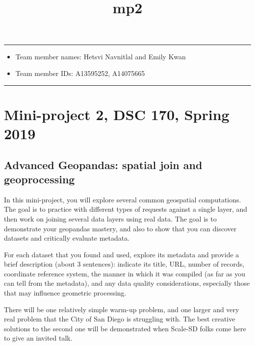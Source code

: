 \documentclass[11pt]{article}
\title{mp2}
\providecommand{\tightlist}{%
      \setlength{\itemsep}{0pt}\setlength{\parskip}{0pt}}
\begin{document}
    
    
    \maketitle
    
    

    
    \begin{center}\rule{0.5\linewidth}{\linethickness}\end{center}

\begin{itemize}
\tightlist
\item
  Team member names: Hetsvi Navnitlal and Emily Kwan
\item
  Team member IDs: A13595252, A14075665
\end{itemize}

\begin{center}\rule{0.5\linewidth}{\linethickness}\end{center}

    \hypertarget{mini-project-2-dsc-170-spring-2019}{%
\section{Mini-project 2, DSC 170, Spring
2019}\label{mini-project-2-dsc-170-spring-2019}}

\hypertarget{advanced-geopandas-spatial-join-and-geoprocessing}{%
\subsection{Advanced Geopandas: spatial join and
geoprocessing}\label{advanced-geopandas-spatial-join-and-geoprocessing}}

    In this mini-project, you will explore several common geospatial
computations. The goal is to practice with different types of requests
against a single layer, and then work on joining several data layers
using real data. The goal is to demonstrate your geopandas mastery, and
also to show that you can discover datasets and critically evaluate
metadata.

For each dataset that you found and used, explore its metadata and
provide a brief description (about 3 sentences): indicate its title,
URL, number of records, coordinate reference system, the manner in which
it was compiled (as far as you can tell from the metadata), and any data
quality considerations, especially those that may influence geometric
processing.

There will be one relatively simple warm-up problem, and one larger and
very real problem that the City of San Diego is struggling with. The
best creative solutions to the second one will be demonstrated when
Scale-SD folks come here to give an invited talk.
\end{document}
